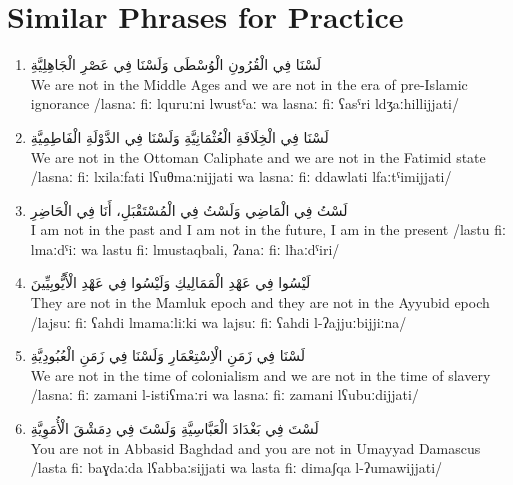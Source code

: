 \documentclass[letterpaper,12pt]{article}
\begin{document}
\begin{tcolorbox}[colback=white,colframe=accentcolor,breakable]
\begin{center}
\end{center}
\end{tcolorbox}

\section{Similar Phrases for Practice}

\begin{enumerate}
\item \textarabic{لَسْنَا فِي الْقُرُونِ الْوُسْطَى وَلَسْنَا فِي عَصْرِ الْجَاهِلِيَّةِ}\\
We are not in the Middle Ages and we are not in the era of pre-Islamic ignorance /lasnaː fiː lquruːni lwustˤaː wa lasnaː fiː ʕasˤri ldʒaːhillijjati/

\item \textarabic{لَسْنَا فِي الْخِلَافَةِ الْعُثْمَانِيَّةِ وَلَسْنَا فِي الدَّوْلَةِ الْفَاطِمِيَّةِ}\\
We are not in the Ottoman Caliphate and we are not in the Fatimid state /lasnaː fiː lxilaːfati lʕuθmaːnijjati wa lasnaː fiː ddawlati lfaːtˤimijjati/

\item \textarabic{لَسْتُ فِي الْمَاضِي وَلَسْتُ فِي الْمُسْتَقْبَلِ، أَنَا فِي الْحَاضِرِ}\\
I am not in the past and I am not in the future, I am in the present /lastu fiː lmaːdˤiː wa lastu fiː lmustaqbali, ʔanaː fiː lħaːdˤiri/

\item \textarabic{لَيْسُوا فِي عَهْدِ الْمَمَالِيكِ وَلَيْسُوا فِي عَهْدِ الْأَيُّوبِيِّينَ}\\
They are not in the Mamluk epoch and they are not in the Ayyubid epoch /lajsuː fiː ʕahdi lmamaːliːki wa lajsuː fiː ʕahdi l-ʔajjuːbijjiːna/

\item \textarabic{لَسْنَا فِي زَمَنِ الْاِسْتِعْمَارِ وَلَسْنَا فِي زَمَنِ الْعُبُودِيَّةِ}\\
We are not in the time of colonialism and we are not in the time of slavery /lasnaː fiː zamani l-istiʕmaːri wa lasnaː fiː zamani lʕubuːdijjati/

\item \textarabic{لَسْتَ فِي بَغْدَادَ الْعَبَّاسِيَّةِ وَلَسْتَ فِي دِمَشْقَ الْأُمَوِيَّةِ}\\
You are not in Abbasid Baghdad and you are not in Umayyad Damascus /lasta fiː baɣdaːda lʕabbaːsijjati wa lasta fiː dimaʃqa l-ʔumawijjati/
\end{enumerate}
\end{document}
